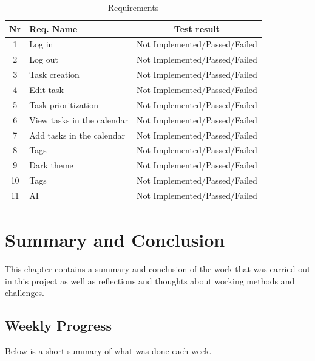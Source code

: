 \documentclass{article}
\begin{document}
\begin{table}[H]
  \centering
  \begin{tabularx}{\textwidth}{|c|X|c|}
    \toprule
    \textbf{Nr} & \textbf{Req. Name}         & \textbf{Test result}          \\
    \hline
    1           & Log in                     & Not Implemented/Passed/Failed \\    \hline
    2           & Log out                    & Not Implemented/Passed/Failed \\    \hline
    3           & Task creation              & Not Implemented/Passed/Failed \\ \hline
    4           & Edit task                  & Not Implemented/Passed/Failed \\    \hline
    5           & Task prioritization        & Not Implemented/Passed/Failed \\    \hline
    6           & View tasks in the calendar & Not Implemented/Passed/Failed \\    \hline
    7           & Add tasks in the calendar  & Not Implemented/Passed/Failed \\    \hline
    8           & Tags                       & Not Implemented/Passed/Failed \\ \hline
    9           & Dark theme                 & Not Implemented/Passed/Failed \\    \hline
    10          & Tags                       & Not Implemented/Passed/Failed \\\hline
    11          & AI                         & Not Implemented/Passed/Failed \\

    \bottomrule
  \end{tabularx}
  \caption{Requirements}
  \label{results}
\end{table}

\section{Summary and Conclusion}
This chapter contains a summary and conclusion of the work that was carried out in this project as well as reflections and thoughts about working methods and challenges.

\subsection{Weekly Progress}
Below is a short summary of what was done each week.
\end{document}
